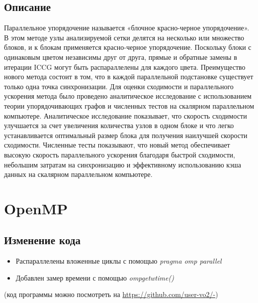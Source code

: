 \documentclass[a4paper,12pt,titlepage,final]{article}
\begin{document}
\subsection{Описание}
Параллельное упорядочение называется «блочное красно-черное упорядочение». В этом методе узлы анализируемой сетки делятся на несколько или множество блоков, и к блокам применяется красно-черное упорядочение. Поскольку блоки с одинаковым цветом независимы друг от друга, прямые и обратные замены в итерации ICCG могут быть распараллелены для каждого цвета. Преимущество нового метода состоит в том, что в каждой параллельной подстановке существует только одна точка синхронизации. Для оценки сходимости и параллельного ускорения метода было проведено аналитическое исследование с использованием теории упорядочивающих графов и численных тестов на скалярном параллельном компьютере. Аналитическое исследование показывает, что скорость сходимости улучшается за счет увеличения количества узлов в одном блоке и что легко устанавливается оптимальный размер блока для получения наилучшей скорости сходимости. Численные тесты показывают, что новый метод обеспечивает высокую скорость параллельного ускорения благодаря быстрой сходимости, небольшим затратам на синхронизацию и эффективному использованию кэша данных на скалярном параллельном компьютере.
\newpage
\section{OpenMP}
\subsection{Изменение кода}
\begin{itemize}
\item Распараллелены вложенные циклы с помощью \textit{pragma omp parallel}
\item Добавлен замер времени с помощью \textit{omp\textunderscore get\textunderscore wtime()}
\end{itemize}
(код программы можно посмотреть на \url{https://github.com/user-vo2/-})
\end{document}
